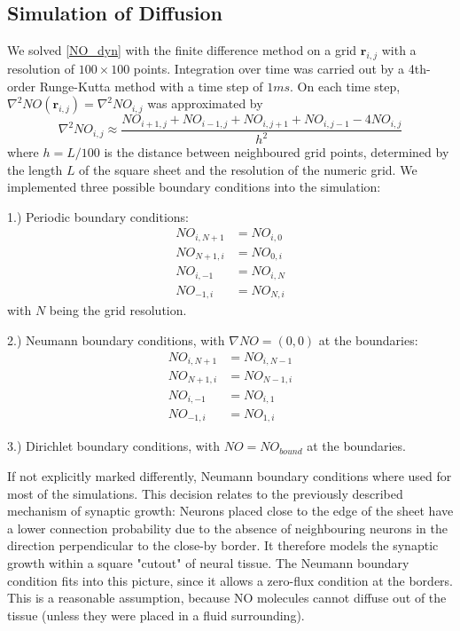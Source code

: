 \documentclass[10pt,a4paper]{article}
\begin{document}
\subsection{Simulation of Diffusion}

We solved \eqref{NO_dyn} with the finite difference method on a grid $\mathbf{r}_{i,j}$ with a resolution of $100\times 100$ points. Integration over time was carried out by a 4th-order Runge-Kutta method with a time step of $1 ms$. On each time step, $\nabla^2 NO(\mathbf{r}_{i,j}) = \nabla^2 NO_{i,j}$ was approximated by
\begin{equation}
\nabla^2 NO_{i,j} \approx \frac{NO_{i+1,j}+NO_{i-1,j}+NO_{i,j+1}+NO_{i,j-1}-4NO_{i,j}}{h^2}
\label{Laplace_Numeric}
\end{equation}
where $h = L/100$ is the distance between neighboured grid points, determined by the length $L$ of the square sheet and the resolution of the numeric grid. We implemented three possible boundary conditions into the simulation:

1.) Periodic boundary conditions:
\begin{align}
NO_{i,N+1} &= NO_{i,0} \label{Periodic_Cond_1} \\
NO_{N+1,i} &= NO_{0,i} \label{Periodic_Cond_2} \\
NO_{i,-1} &= NO_{i,N} \label{Periodic_Cond_3} \\
NO_{-1,i} &= NO_{N,i} \label{Periodic_Cond_4}
\end{align}
with $N$ being the grid resolution.

2.) Neumann boundary conditions, with $\nabla NO = (0,0)$ at the boundaries:
\begin{align}
NO_{i,N+1} &= NO_{i,N-1} \label{Neumann_Cond_1} \\
NO_{N+1,i} &= NO_{N-1,i} \label{Neumann_Cond_2} \\
NO_{i,-1} &= NO_{i,1} \label{Neumann_Cond_3} \\
NO_{-1,i} &= NO_{1,i} \label{Neumann_Cond_4}
\end{align}

3.) Dirichlet boundary conditions, with $NO = NO_{bound}$ at the boundaries.

If not explicitly marked differently, Neumann boundary conditions where used for most of the simulations. This decision relates to the previously described mechanism of synaptic growth: Neurons placed close to the edge of the sheet have a lower connection probability due to the absence of neighbouring neurons in the direction perpendicular to the close-by border. It therefore models the synaptic growth within a square "cutout" of neural tissue. The Neumann boundary condition fits into this picture, since it allows a zero-flux condition at the borders. This is a reasonable assumption, because NO molecules cannot diffuse out of the tissue (unless they were placed in a fluid surrounding).
\end{document}
